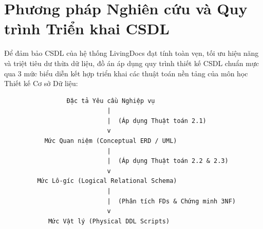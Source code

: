 \section*{Phương pháp Nghiên cứu và Quy trình Triển khai CSDL}
Để đảm bảo CSDL của hệ thống LivingDocs đạt tính toàn vẹn, tối ưu hiệu năng và triệt tiêu dư thừa dữ liệu, đồ án áp dụng quy trình thiết kế CSDL chuẩn mực qua 3 mức biểu diễn kết hợp triển khai các thuật toán nền tảng của môn học Thiết kế Cơ sở Dữ liệu:

\begin{center}
\begin{small}
\begin{verbatim}
                 Đặc tả Yêu cầu Nghiệp vụ
                            |
                            |  (Áp dụng Thuật toán 2.1)
                            v
           Mức Quan niệm (Conceptual ERD / UML)
                            |
                            |  (Áp dụng Thuật toán 2.2 & 2.3)
                            v
         Mức Lô-gíc (Logical Relational Schema)
                            |
                            |  (Phân tích FDs & Chứng minh 3NF)
                            v
            Mức Vật lý (Physical DDL Scripts)
\end{verbatim}
\end{small}
\end{center}
